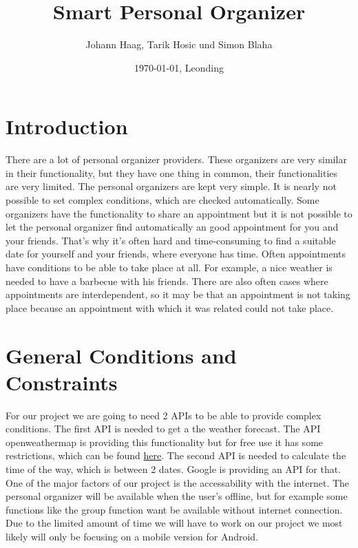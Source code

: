 \documentclass[12pt]{scrartcl}
\title{Smart Personal Organizer}
\author{Johann Haag, Tarik Hosic und Simon Blaha}
\date{\today{}, Leonding}
\begin{document}
    \maketitle
    \pagebreak
    \tableofcontents
    \pagebreak

    \section{Introduction}
    
    There are a lot of personal organizer providers. 
    These organizers are very similar in their functionality, but they have one thing in common, 
    their functionalities are very limited. The personal organizers are kept very simple. It is
    nearly not possible to set complex conditions, which are checked automatically.  
    \newline
    Some organizers have the functionality to share an appointment but it is not possible
    to let the personal organizer find automatically an good appointment for you and your friends.
    \newline 
    That's why it's often hard and time-consuming to 
    find a suitable date for yourself and your friends, where everyone has time.
    \newline
    Often appointments have conditions to be able to take place at all. 
    \newline 
    For example, a nice weather is needed to have a barbecue with his friends. 
    \newline
    There are also often cases where appointments are interdependent, 
    so it may be that an appointment is not taking place because an appointment with 
    which it was related could not take place.
    
    \pagebreak

    \section{General Conditions and Constraints}

        For our project we are going to need 2 APIs to be able to provide complex conditions.
        The first API is needed to get a the weather forecast. The API openweathermap is providing this functionality 
        but for free use it has some restrictions, which can be found \href{https://openweathermap.org/price}{here}.
        \newline
        The second API is needed to calculate the time of the way, which is between 2 dates.
        Google is providing an API for that. One of the major factors of our project is the accessability with the internet. 
        The personal organizer will be available when the user's offline, but for example 
        some functions like the group function want be available without internet connection. 
        Due to the limited amount of time we will have to work on our
        project we most likely will only be focusing on a mobile version for Android.
\end{document}
